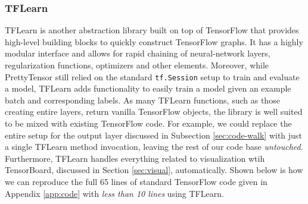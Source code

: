 \subsubsection{TFLearn}\label{sec:code-abstract-prettytensor}

TFLearn is another abstraction library built on top of TensorFlow that provides
high-level building blocks to quickly construct TensorFlow graphs. It has a
highly modular interface and allows for rapid chaining of neural-network layers,
regularization functions, optimizers and other elements. Moreover, while
PrettyTensor still relied on the standard \texttt{tf.Session} setup to train and
evaluate a model, TFLearn adds functionality to easily train a model given an
example batch and corresponding labels. As many TFLearn functions, such as those
creating entire layers, return vanilla TensorFlow objects, the library is well
suited to be mixed with existing TensorFlow code. For example, we could replace
the entire setup for the output layer discussed in Subsection
\ref{sec:code-walk} with just a single TFLearn method invocation, leaving the
rest of our code base \emph{untouched}. Furthermore, TFLearn handles everything
related to visualization wtih TensorBoard, discussed in Section
\ref{sec:visual}, automatically. Shown below is how we can reproduce the full 65
lines of standard TensorFlow code given in Appendix \ref{app:code} with
\emph{less than 10 lines} using TFLearn.



